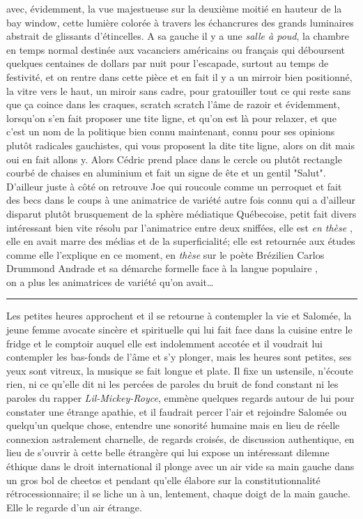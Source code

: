 avec, évidemment, la vue majestueuse sur la deuxième moitié en hauteur de la bay
window, cette lumière colorée à travers les échancrures des grands luminaires
abstrait de glissants d'étincelles.  
A sa gauche il y a une \emph{salle à poud}, la chambre en temps normal 
destinée aux vacanciers
américains ou français qui déboursent quelques centaines de dollars par nuit
pour l'escapade, surtout au temps de festivité, et on rentre dans cette pièce
et en fait il y a un mirroir bien positionné, la vitre vers le haut, un miroir
sans cadre, pour gratouiller tout ce qui reste sans que ça coince dans les
craques, scratch scratch l'âme de razoir et évidemment, lorsqu'on s'en fait
proposer une tite ligne, et qu'on est là pour relaxer, et que c'est un nom de
la politique bien connu maintenant, connu pour ses opinions plutôt radicales
gauchistes, qui vous proposent la dite tite ligne, alors on dit mais oui en fait
allons y. Alors Cédric prend place dans le cercle ou plutôt rectangle courbé
de chaises en aluminium et fait un signe de ête et un gentil "Salut". 
D'ailleur juste à côté on retrouve Joe qui roucoule comme un
perroquet et fait des becs dans le coups à une animatrice
de variété autre fois connu qui a d'ailleur disparut plutôt brusquement de la
sphère médiatique Québecoise, petit fait divers intéressant bien vite résolu par
l'animatrice entre deux sniffées, elle est \emph{en thèse} , elle en avait marre
des médias et de la superficialité; elle est retournée aux études comme elle
l'explique en ce moment, en \emph{thèse} sur le poète Brézilien Carlos Drummond
Andrade et sa démarche formelle face à la langue populaire , \\ on a plus les
animatrices de variété qu'on avait\ldots\newpage

\begin{center}\noindent\rule{0.5\textwidth}{0.4pt}\end{center} Les petites
heures approchent et il se retourne à contempler la vie et Salomée, la jeune
femme avocate sincère et spirituelle qui lui fait face dans la cuisine entre le
fridge et le comptoir auquel elle est indolemment accotée et il voudrait lui
contempler les bas-fonds de l'âme et s'y plonger, mais les heures sont petites,
ses yeux sont vitreux, la musique se fait longue et plate.  Il fixe un
ustensile, n'écoute rien, ni ce qu'elle dit ni les percées de paroles du bruit
de fond constant ni les paroles du rapper \textit{Lil-Mickey-Royce}, emmène
quelques regards autour de lui pour constater une étrange apathie, et il
faudrait percer l'air et rejoindre Salomée ou quelqu'un quelque chose, entendre
une sonorité humaine mais en lieu de réelle connexion astralement charnelle, de
regards croisés, de discussion authentique, en lieu de s'ouvrir à cette belle
étrangère qui lui expose un intéressant dilemne éthique dans le droit
international il plonge avec un air vide sa main gauche dans un gros bol de
cheetos et pendant qu'elle élabore sur la constitutionnalité rétrocessionnaire;
il se liche un à un, lentement, chaque doigt de la main gauche. Elle le regarde
d'un air étrange. \\



